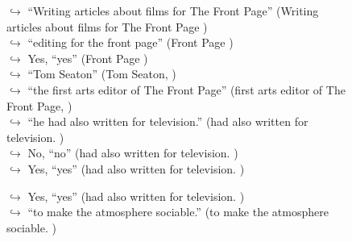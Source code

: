 \documentclass[11pt,a4paper, onecolumn]{article}
\begin{document}
\begin{figure}[t] \small \begin{tcolorbox}[boxsep=0pt,left=5pt,right=0pt,top=2pt,colback = yellow!5] \begin{dialogue}
 \small 
\colorbox{pink!25}{$\hookrightarrow$}
{ ``Writing articles about films for The Front Page'' (Writing articles about films for The Front Page ) }
\\
\colorbox{pink!25}{$\hookrightarrow$}
{ ``editing for the front page'' (Front Page ) }
\\
\colorbox{pink!25}{$\hookrightarrow$}
\colorbox{red!25}{Yes,}
{ ``yes'' (Front Page ) }
\\
\colorbox{pink!25}{$\hookrightarrow$}
{ ``Tom Seaton'' (Tom Seaton, ) }
\\
\colorbox{pink!25}{$\hookrightarrow$}
{ ``the first arts editor of The Front Page'' (first arts editor of The Front Page, ) }
\\
\colorbox{pink!25}{$\hookrightarrow$}
{ ``he had also written for television.'' (had also written for television. ) }
\\
\colorbox{pink!25}{$\hookrightarrow$}
\colorbox{red!25}{No,}
{ ``no'' (had also written for television. ) }
\\
\colorbox{pink!25}{$\hookrightarrow$}
\colorbox{red!25}{Yes,}
{ ``yes'' (had also written for television. ) }
 \end{dialogue}\end{tcolorbox}\end{figure}\begin{figure}[t] \small \begin{tcolorbox}[boxsep=0pt,left=5pt,right=0pt,top=2pt,colback = yellow!5] \begin{dialogue}
 \small 
\colorbox{pink!25}{$\hookrightarrow$}
\colorbox{red!25}{Yes,}
{ ``yes'' (had also written for television. ) }
\\
\colorbox{pink!25}{$\hookrightarrow$}
{ ``to make the atmosphere sociable.'' (to make the atmosphere sociable. ) }
\\
 \end{dialogue}\end{tcolorbox}\end{figure}
\end{document}
